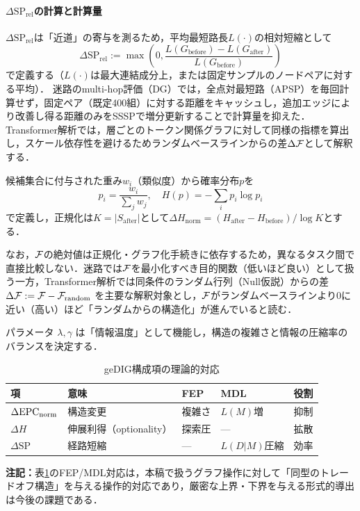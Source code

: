 \paragraph{$\Delta \mathrm{SP}_{\mathrm{rel}}$の計算と計算量}
$\Delta \mathrm{SP}_{\mathrm{rel}}$は「近道」の寄与を測るため，平均最短路長$L(\cdot)$の相対短縮として
\begin{equation}
\Delta \mathrm{SP}_{\mathrm{rel}} := \max\!\left(0, \frac{L(G_{\mathrm{before}})-L(G_{\mathrm{after}})}{L(G_{\mathrm{before}})}\right)
\end{equation}
で定義する（$L(\cdot)$は最大連結成分上，または固定サンプルのノードペアに対する平均）．
迷路のmulti-hop評価（DG）では，全点対最短路（APSP）を毎回計算せず，固定ペア（既定400組）に対する距離をキャッシュし，追加エッジにより改善し得る距離のみをSSSPで増分更新することで計算量を抑えた．
Transformer解析では，層ごとのトークン関係グラフに対して同様の指標を算出し，スケール依存性を避けるためランダムベースラインからの差$\Delta\mathcal{F}$として解釈する．

候補集合に付与された重み$w_i$（類似度）から確率分布$p$を
\begin{equation}
p_i = \frac{w_i}{\sum_j w_j},\quad
H(p) = -\sum_i p_i \log p_i
\end{equation}
で定義し，正規化は$K=|S_{\mathrm{after}}|$として$\Delta H_{\mathrm{norm}} = (H_{\mathrm{after}}-H_{\mathrm{before}})/\log K$とする．

なお，$\mathcal{F}$の絶対値は正規化・グラフ化手続きに依存するため，異なるタスク間で直接比較しない．迷路では$\mathcal{F}$を最小化すべき目的関数（低いほど良い）として扱う一方，Transformer解析では同条件のランダム行列（Null仮説）からの差 $\Delta \mathcal{F} := \mathcal{F}-\mathcal{F}_{\mathrm{random}}$ を主要な解釈対象とし，$\mathcal{F}$がランダムベースラインより0に近い（高い）ほど「ランダムからの構造化」が進んでいると読む．

パラメータ $\lambda, \gamma$ は「情報温度」として機能し，構造の複雑さと情報の圧縮率のバランスを決定する．

\begin{table}[t]
\centering
\caption{geDIG構成項の理論的対応}
\label{tab:gedig_terms}
\scriptsize
\begin{tabular}{@{}lllll@{}}
\toprule
項 & 意味 & FEP & MDL & 役割 \\
\midrule
$\Delta\mathrm{EPC}_{\mathrm{norm}}$ & 構造変更 & 複雑さ & $L(M)$増 & 抑制 \\
$\Delta H$ & 伸展利得（optionality） & 探索圧 & --- & 拡散 \\
$\Delta \mathrm{SP}$ & 経路短縮 & --- & $L(D|M)$圧縮 & 効率 \\
\bottomrule
\end{tabular}
\end{table}
\noindent\textbf{注記：}表\ref{tab:gedig_terms}のFEP/MDL対応は，本稿で扱うグラフ操作に対して「同型のトレードオフ構造」を与える操作的対応であり，厳密な上界・下界を与える形式的導出は今後の課題である．

